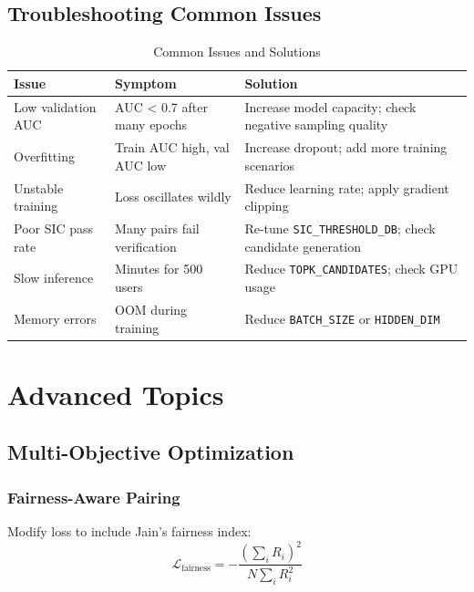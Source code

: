 \documentclass[12pt,a4paper]{article}
\begin{document}
\subsection{Troubleshooting Common Issues}

\begin{table}[H]
\centering
\small
\begin{tabular}{@{}p{4cm}p{5cm}p{5cm}@{}}
\toprule
\textbf{Issue} & \textbf{Symptom} & \textbf{Solution} \\
\midrule
Low validation AUC & AUC < 0.7 after many epochs & Increase model capacity; check negative sampling quality \\
\midrule
Overfitting & Train AUC high, val AUC low & Increase dropout; add more training scenarios \\
\midrule
Unstable training & Loss oscillates wildly & Reduce learning rate; apply gradient clipping \\
\midrule
Poor SIC pass rate & Many pairs fail verification & Re-tune \texttt{SIC\_THRESHOLD\_DB}; check candidate generation \\
\midrule
Slow inference & Minutes for 500 users & Reduce \texttt{TOPK\_CANDIDATES}; check GPU usage \\
\midrule
Memory errors & OOM during training & Reduce \texttt{BATCH\_SIZE} or \texttt{HIDDEN\_DIM} \\
\bottomrule
\end{tabular}
\caption{Common Issues and Solutions}
\end{table}

\section{Advanced Topics}

\subsection{Multi-Objective Optimization}

\subsubsection{Fairness-Aware Pairing}
Modify loss to include Jain's fairness index:
\begin{equation}
\mathcal{L}_{\text{fairness}} = -\frac{(\sum_i R_i)^2}{N \sum_i R_i^2}
\end{equation}
\end{document}
